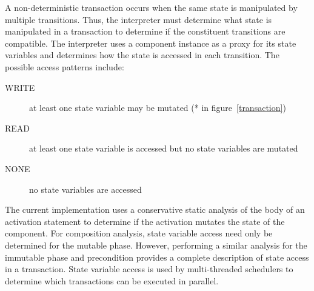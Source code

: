 A non-deterministic transaction occurs when the same state is manipulated by multiple transitions.
Thus, the interpreter must determine what state is manipulated in a transaction to determine if the constituent transitions are compatible.
The interpreter uses a component instance as a proxy for its state variables and determines how the state is accessed in each transition.
The possible access patterns include:
\begin{description}
  \item[WRITE] at least one state variable may be mutated (* in figure~\ref{transaction})
  \item[READ] at least one state variable is accessed but no state variables are mutated
  \item[NONE] no state variables are accessed
\end{description}
The current implementation uses a conservative static analysis of the body of an activation statement to determine if the activation mutates the state of the component.
For composition analysis, state variable access need only be determined for the mutable phase.
However, performing a similar analysis for the immutable phase and precondition provides a complete description of state access in a transaction.
State variable access is used by multi-threaded schedulers to determine which transactions can be executed in parallel.

